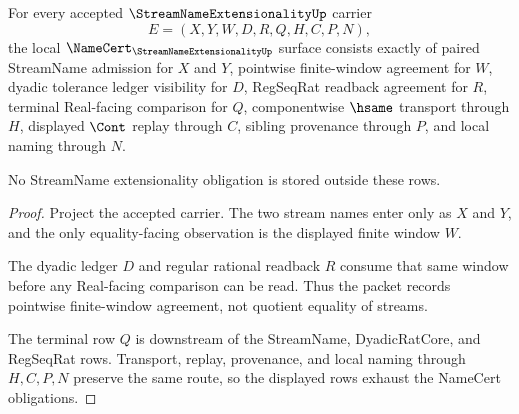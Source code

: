 \begin{theorem}
\label{thm:streamname-extensionality-namecert-obligations}
For every accepted $\StreamNameExtensionalityUp$ carrier
$$
E=(X,Y,W,D,R,Q,H,C,P,N),
$$
the local $\NameCert_{\StreamNameExtensionalityUp}$ surface consists exactly of paired StreamName admission for $X$ and $Y$, pointwise finite-window agreement for $W$, dyadic tolerance ledger visibility for $D$, RegSeqRat readback agreement for $R$, terminal Real-facing comparison for $Q$, componentwise $\hsame$ transport through $H$, displayed $\Cont$ replay through $C$, sibling provenance through $P$, and local naming through $N$.

No StreamName extensionality obligation is stored outside these rows.
\end{theorem}
\begin{proof}
Project the accepted carrier. The two stream names enter only as $X$ and $Y$, and the only equality-facing observation is the displayed finite window $W$.

The dyadic ledger $D$ and regular rational readback $R$ consume that same window before any Real-facing comparison can be read. Thus the packet records pointwise finite-window agreement, not quotient equality of streams.

The terminal row $Q$ is downstream of the StreamName, DyadicRatCore, and RegSeqRat rows. Transport, replay, provenance, and local naming through $H,C,P,N$ preserve the same route, so the displayed rows exhaust the NameCert obligations.
\end{proof}

